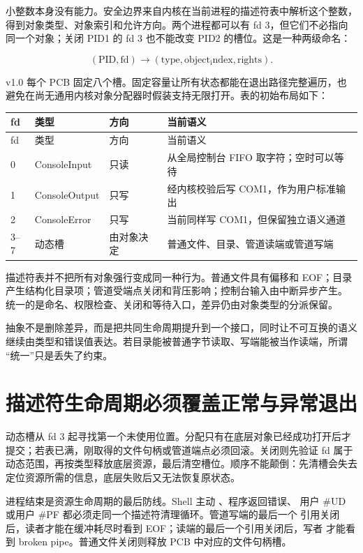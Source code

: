 小整数本身没有能力。安全边界来自内核在当前进程的描述符表中解析这个整数，
得到对象类型、对象索引和允许方向。两个进程都可以有 fd 3，但它们不必指向
同一个对象；关闭 PID1 的 fd 3 也不能改变 PID2 的槽位。这是一种两级命名：

\[
  (\mathrm{PID},\mathrm{fd})
  \longrightarrow
  (\mathrm{type},\mathrm{object_index},\mathrm{rights}).
\]

v1.0 每个 PCB 固定八个槽。固定容量让所有状态都能在退出路径完整遍历，也
避免在尚无通用内核对象分配器时假装支持无限打开。表的初始布局如下：

\begin{longtable}{L{0.10\textwidth}L{0.22\textwidth}L{0.18\textwidth}L{0.38\textwidth}}
\toprule
fd & 类型 & 方向 & 当前语义\\
\midrule
\endfirsthead
\toprule
fd & 类型 & 方向 & 当前语义\\
\midrule
{} & ConsoleInput & 只读 & 从全局控制台 FIFO 取字符；空时可以等待\\
1 & ConsoleOutput & 只写 & 经内核校验后写 COM1，作为用户标准输出\\
2 & ConsoleError & 只写 & 当前同样写 COM1，但保留独立语义通道\\
3--7 & 动态槽 & 由对象决定 & 普通文件、目录、管道读端或管道写端\\
\bottomrule
\end{longtable}

描述符表并不把所有对象强行变成同一种行为。普通文件具有偏移和 EOF；目录
产生结构化目录项；管道受端点关闭和背压影响；控制台输入由中断异步产生。
统一的是命名、权限检查、关闭和等待入口，差异仍由对象类型的分派保留。

\begin{keyidea}
抽象不是删除差异，而是把共同生命周期提升到一个接口，同时让不可互换的语义
继续由类型和错误值表达。若目录能被普通字节读取、写端能被当作读端，所谓
“统一”只是丢失了约束。
\end{keyidea}

\section{描述符生命周期必须覆盖正常与异常退出}

动态槽从 fd 3 起寻找第一个未使用位置。分配只有在底层对象已经成功打开后才
提交；若表已满，刚取得的文件句柄或管道端点必须回滚。关闭则先验证 fd 属于
动态范围，再按类型释放底层资源，最后清空槽位。顺序不能颠倒：先清槽会失去
定位资源所需的信息，底层失败后又无法恢复原状态。

进程结束是资源生命周期的最后防线。Shell 主动 、程序返回错误、
用户 \#UD 或用户 \#PF 都必须走同一个描述符清理循环。管道写端的最后一个
引用关闭后，读者才能在缓冲耗尽时看到 EOF；读端的最后一个引用关闭后，写者
才能看到 broken pipe。普通文件关闭则释放 PCB 中对应的文件句柄槽。

